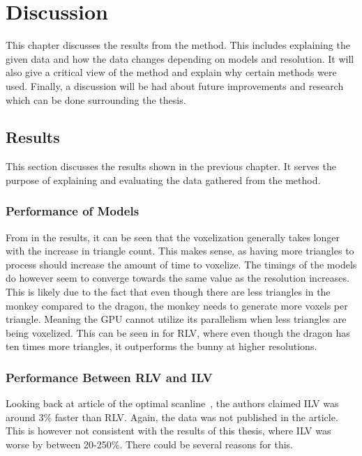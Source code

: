 \chapter{Discussion}\label{cha:discussion}
This chapter discusses the results from the method.
This includes explaining the given data and how the data changes depending on models and resolution.
It will also give a critical view of the method and explain why certain methods were used.
Finally, a discussion will be had about future improvements and research which can be done surrounding the thesis.

\section{Results}
This section discusses the results shown in the previous chapter.
It serves the purpose of explaining and evaluating the data gathered from the method.

\subsection{Performance of Models}
From  in the results, it can be seen that the voxelization generally takes longer with the increase in triangle count.
This makes sense, as having more triangles to process should increase the amount of time to voxelize. 
The timings of the models do however seem to converge towards the same value as the resolution increases.
This is likely due to the fact that even though there are less triangles in the monkey compared to the dragon, the monkey needs to generate more voxels per triangle.
Meaning the GPU cannot utilize its parallelism when less triangles are being voxelized.
This can be seen in  for RLV, where even though the dragon has ten times more triangles, it outperforms the bunny at higher resolutions.

\vfill

\subsection{Performance Between RLV and ILV}
Looking back at article of the optimal scanline~\cite{scanline-voxelization}, the authors claimed 
ILV was around 3\% faster than RLV. 
Again, the data was not published in the article.
This is however not consistent with the results of this thesis, where ILV was worse by between 20-250\%.
There could be several reasons for this.

